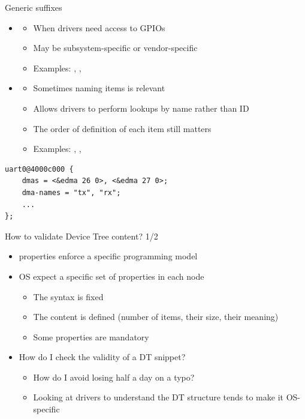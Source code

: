 \begin{frame}[fragile]{Generic suffixes}
  \begin{itemize}
  \item {}
    \begin{itemize}
    \item When drivers need access to GPIOs
    \item May be subsystem-specific or vendor-specific
    \item Examples: , , 
    \end{itemize}
  \item {}
    \begin{itemize}
    \item Sometimes naming items is relevant
    \item Allows drivers to perform lookups by name rather than ID
    \item The order of definition of each item still matters
    \item Examples: , ,
    \end{itemize}
  \end{itemize}
  \begin{block}{}
    \begin{verbatim}
uart0@4000c000 {
    dmas = <&edma 26 0>, <&edma 27 0>;
    dma-names = "tx", "rx";
    ...
};
    \end{verbatim}
  \end{block}
\end{frame}

\begin{frame}{How to validate Device Tree content? 1/2}
  \begin{itemize}
  \item {} properties enforce a specific programming model
  \item OS expect a specific set of properties in each node
    \begin{itemize}
    \item The syntax is fixed
    \item The content is defined (number of items, their size, their meaning)
    \item Some properties are mandatory
    \end{itemize}
  \item How do I check the validity of a DT snippet?
    \begin{itemize}
    \item How do I avoid losing half a day on a typo?
    \item Looking at drivers to understand the DT structure tends to make it OS-specific
    \end{itemize}
  \end{itemize}
\end{frame}

